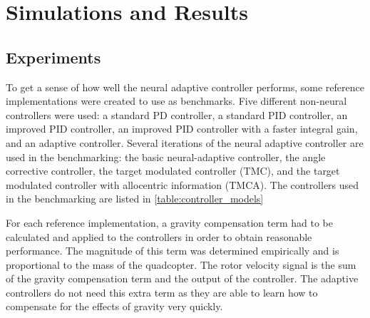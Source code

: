 \documentclass[letterpaper,12pt,titlepage,oneside,final]{book}
\begin{document}
\chapter{Simulations and Results} \label{chap:analysis}

\section{Experiments}


To get a sense of how well the neural adaptive controller performs, some reference implementations were created to use as benchmarks. 
Five different non-neural controllers were used: a standard PD controller, a standard PID controller, an improved PID controller, an improved PID controller with a faster integral gain, and an adaptive controller. 
Several iterations of the neural adaptive controller are used in the benchmarking: the basic neural-adaptive controller, the angle corrective controller, the target modulated controller (TMC), and the target modulated controller with allocentric information (TMCA). %
The controllers used in the benchmarking are listed in \autoref{table:controller_models}


For each reference implementation, a gravity compensation term had to be calculated and applied to the controllers in order to obtain reasonable performance. 
The magnitude of this term was determined empirically and is proportional to the mass of the quadcopter. 
The rotor velocity signal is the sum of the gravity compensation term and the output of the controller.
The adaptive controllers do not need this extra term as they are able to learn how to compensate for the effects of gravity very quickly.
\end{document}
